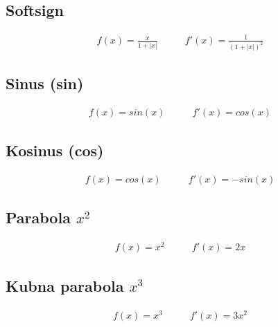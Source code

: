 \documentclass[times, utf8, diplomski]{fer}
\begin{document}
\subsection*{Softsign}
\begin{equation}
\begin{split}
f(x) = \frac{x}{1+|x|}
\end{split}
\qquad
\begin{split}
f'(x) = \frac{1}{(1+|x|)^2}
\end{split}
\end{equation}

\subsection*{Sinus (sin)}
\begin{equation}
\begin{split}
f(x) = sin(x)
\end{split}
\qquad
\begin{split}
f'(x) = cos(x)
\end{split}
\end{equation}

\subsection*{Kosinus (cos)}
\begin{equation}
\begin{split}
f(x) = cos(x)
\end{split}
\qquad
\begin{split}
f'(x) = -sin(x)
\end{split}
\end{equation}

\subsection*{Parabola $x^2$}
\begin{equation}
\begin{split}
f(x) = x^2
\end{split}
\qquad
\begin{split}
f'(x) = 2x
\end{split}
\end{equation}

\subsection*{Kubna parabola $x^3$}
\begin{equation}
\begin{split}
f(x) = x^3
\end{split}
\qquad
\begin{split}
f'(x) = 3x^2
\end{split}
\end{equation}
\end{document}
